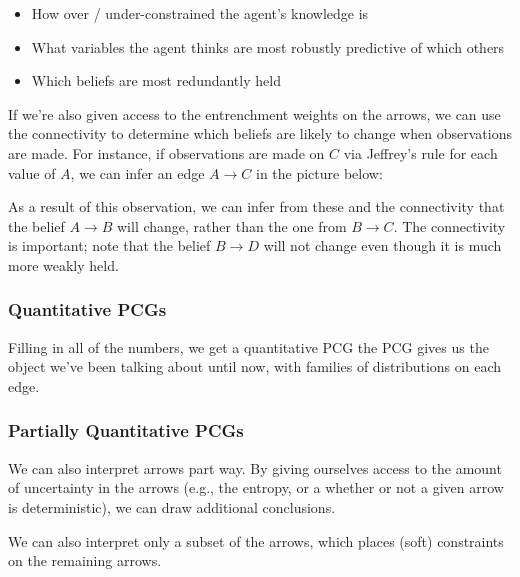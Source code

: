 \documentclass{article}
\begin{document}
	\begin{itemize}[nosep]
		\item How over / under-constrained the agent's knowledge is
		\item What variables the agent thinks are most robustly predictive of which others
		\item Which beliefs are most redundantly held
	\end{itemize} 
	If we're also given access to the entrenchment weights on the arrows, we can use the connectivity to determine which beliefs are likely to change when observations are made. For instance, if observations are made on $C$ via Jeffrey's rule for each value of $A$, we can infer an edge $A \to C$ in the picture below:
	\begin{center}
	\end{center}
	As a result of this observation, we can infer from these and the connectivity that the belief $A \to B$ will change, rather than the one from $B \to C$. The connectivity is important; note that the belief $B \to D$ will not change even though it is much more weakly held.

	
	\subsubsection{Quantitative PCGs}
	Filling in all of the numbers, we get a quantitative PCG the PCG gives us the object we've been talking about until now, with families of distributions on each edge. 
	
	\subsubsection{Partially Quantitative PCGs}
	We can also interpret arrows part way. By giving ourselves access to the amount of uncertainty in the arrows (e.g., the entropy, or a whether or not a given arrow is deterministic), we can draw additional conclusions.
	
	
	We can also interpret only a subset of the arrows, which places (soft) constraints on the remaining arrows. 
	
\end{document}
